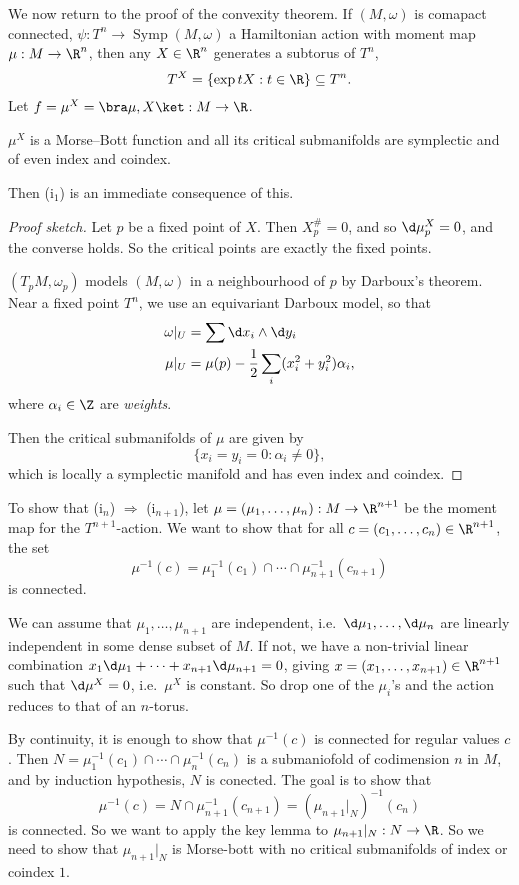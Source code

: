 \documentclass[a4paper]{article}
\DeclareMathOperator{\Symp}{Symp}
\begin{document}
We now return to the proof of the convexity theorem. If $(M, \omega)$ is comapact connected, $\psi: T^n \to \Symp(M, \omega)$ a Hamiltonian action with moment map $\mu: M \to \R^n$, then any $X \in \R^n$ generates a subtorus of $T^n$,
\[
  T^X = \{\exp tX : t \in \R\} \subseteq T^n.
\]
Let $f = \mu^X = \bra \mu, X\ket : M \to \R$.
\begin{claim}
  $\mu^X$ is a Morse--Bott function and all its critical submanifolds are symplectic and of even index and coindex.
\end{claim}
Then (i$_1$) is an immediate consequence of this.

\begin{proof}[Proof sketch]
  Let $p$ be a fixed point of $X$. Then $X^\#_p = 0$, and so $\d \mu^X_p = 0$, and the converse holds. So the critical points are exactly the fixed points. 

  $(T_p M, \omega_p)$ models $(M, \omega)$ in a neighbourhood of $p$ by Darboux's theorem. Near a fixed point $T^n$, we use an equivariant Darboux model, so that
  \begin{align*}
    \omega|_U &= \sum \d x_i \wedge \d y_i\\
    \mu|_U &= \mu(p) - \frac{1}{2} \sum_i (x_i^2 + y_i^2) \alpha_i,
  \end{align*}
  where $\alpha_i \in \Z$ are \emph{weights}.

  Then the critical submanifolds of $\mu$ are given by
  \[
     \{x_i = y_i = 0 : \alpha_i \not= 0\},
  \]
  which is locally a symplectic manifold and has even index and coindex.
\end{proof}

To show that (i$_n$) $\Rightarrow$ (i$_{n + 1}$), let $\mu = (\mu_1, \ldots, \mu_n): M \to \R^{n + 1}$ be the moment map for the $T^{n + 1}$-action. We want to show that for all $c = (c_1, \ldots, c_n) \in \R^{n + 1}$, the set
\[
  \mu^{-1}(c) = \mu_1^{-1}(c_1) \cap \cdots \cap \mu_{n + 1}^{-1}(c_{n + 1})
\]
is connected.

We can assume that $\mu_1, \ldots, \mu_{n + 1}$ are independent, i.e.\ $\d \mu_1, \ldots, \d\mu_{n}$ are linearly independent in some dense subset of $M$. If not, we have a non-trivial linear combination $x_1 \d \mu_1 + \cdots + x_{n + 1} \d \mu_{n + 1} = 0$, giving $x = (x_1, \ldots, x_{n +1}) \in \R^{n + 1}$ such that $\d \mu^X = 0$, i.e.\ $\mu^X$ is constant. So drop one of the $\mu_i$'s and the action reduces to that of an $n$-torus. %

By continuity, it is enough to show that $\mu^{-1}(c)$ is connected for regular values $c$. Then $N = \mu_1^{-1}(c_1) \cap \cdots \cap \mu_n^{-1}(c_n)$ is a submaniofold of codimension $n$ in $M$, and by induction hypothesis, $N$ is conected. The goal is to show that
\[
  \mu^{-1}(c) = N \cap \mu_{n + 1}^{-1}(c_{n + 1}) = (\mu_{n + 1}|_N)^{-1}(c_n)
\]
is connected. So we want to apply the key lemma to $\mu_{n + 1}|_N: N \to \R$. So we need to show that $\mu_{n + 1}|_N$ is Morse-bott with no critical submanifolds of index or coindex $1$.
\end{document}
